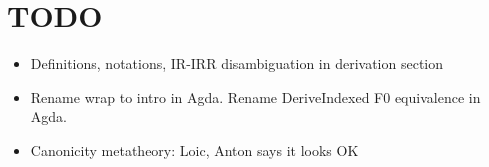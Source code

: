 \documentclass[acmsmall,screen,review,anonymous]{acmart}
\begin{document}
\section{TODO}


\begin{itemize}
  \item Definitions, notations, IR-IRR disambiguation in derivation section
  \item Rename wrap to intro in Agda. Rename DeriveIndexed F0 equivalence in Agda.
  \item Canonicity metatheory: Loic, Anton says it looks OK

\end{itemize}



\end{document}
